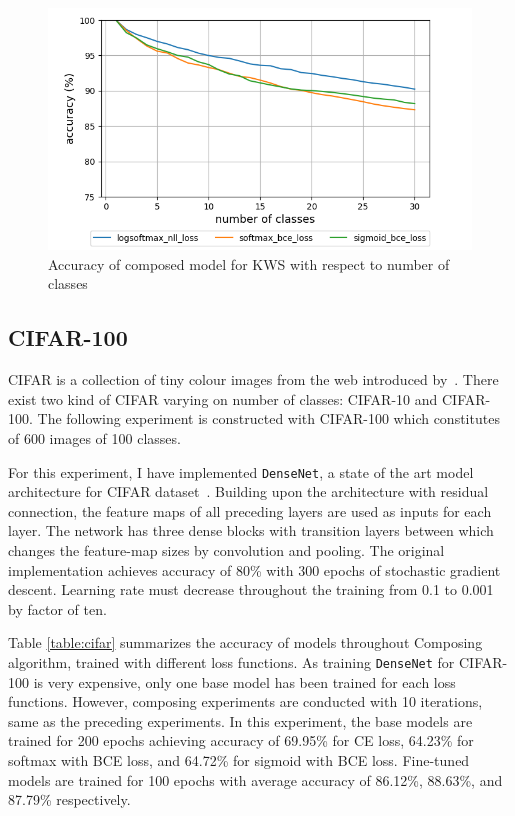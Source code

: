\documentclass{article}
\begin{document}
\begin{figure}[t]
    \centering
    \includegraphics[scale=0.5,trim={0mm 0mm 0mm 0mm},clip]{kws.png}
    \caption{Accuracy of composed model for KWS with respect to number of classes}
    \label{figure:composed_kws}
\end{figure}

\subsection{CIFAR-100}

CIFAR is a collection of tiny colour images from the web introduced by~\cite{krizhevsky2009learning}. There exist two kind of CIFAR varying on number of classes: CIFAR-10 and CIFAR-100. The following experiment is constructed with CIFAR-100 which constitutes of 600 images of 100 classes.

For this experiment, I have implemented \texttt{DenseNet}, a state of the art model architecture for CIFAR dataset~\cite{huang2017densely}. Building upon the architecture with residual connection, the feature maps of all preceding layers are used as inputs for each layer. The network has three dense blocks with transition layers between which changes the feature-map sizes by convolution and pooling. The original implementation achieves accuracy of 80\% with 300 epochs of stochastic gradient descent. Learning rate must decrease throughout the training from 0.1 to 0.001 by factor of ten.

Table \ref{table:cifar} summarizes the accuracy of models throughout Composing algorithm, trained with different loss functions. As training \texttt{DenseNet} for CIFAR-100 is very expensive, only one base model has been trained for each loss functions. However, composing experiments are conducted with 10 iterations, same as the preceding experiments. In this experiment, the base models are trained for 200 epochs achieving accuracy of 69.95\% for CE loss, 64.23\% for softmax with BCE loss, and 64.72\% for sigmoid with BCE loss. Fine-tuned models are trained for 100 epochs with average accuracy of 86.12\%, 88.63\%, and 87.79\% respectively.
\end{document}
